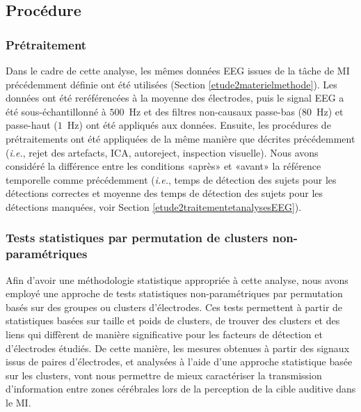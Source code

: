 \subsection{Procédure}
\label{proceduretransmissiondinfo}

\subsubsection{Prétraitement}
\label{pretraitementtransmissiondinfo}

Dans le cadre de cette analyse, les mêmes données EEG issues de la tâche de MI précédemment définie ont été utilisées (Section \ref{etude2materielmethode}). 
Les données ont été reréférencées à la moyenne des électrodes, puis le signal EEG a été sous-échantillonné à $500$~Hz et des filtres non-causaux passe-bas ($80$~Hz) et passe-haut ($1$~Hz) ont été appliqués aux données. 
Ensuite, les procédures de prétraitements ont été appliquées de la même manière que décrites précédemment (\textit{i.e.}, rejet des artefacts, ICA, autoreject, inspection visuelle). 
Nous avons considéré la différence entre les conditions «après» et «avant» la référence temporelle comme précédemment (\textit{i.e.}, temps de détection des sujets pour les détections correctes et moyenne des temps de détection des sujets pour les détections manquées, voir Section \ref{etude2traitementetanalysesEEG}). 

\subsubsection{Tests statistiques par permutation de clusters non-paramétriques}
\label{testspermutclusters}

Afin d'avoir une méthodologie statistique appropriée à cette analyse, nous avons employé une approche de tests statistiques non-paramétriques par permutation basés sur des groupes ou clusters d'électrodes. 
Ces tests permettent à partir de statistiques basées sur taille et poids de clusters, de trouver des clusters et des liens qui diffèrent de manière significative pour les facteurs de détection et d'électrodes étudiés. 
De cette manière, les mesures obtenues à partir des signaux issus de paires d'électrodes, et analysées à l'aide d'une approche statistique basée sur les clusters, vont nous permettre de mieux caractériser la transmission d'information entre zones cérébrales lors de la perception de la cible auditive dans le MI.


